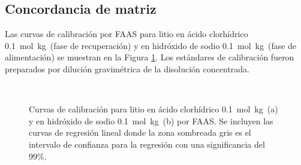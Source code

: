 \subsection{Concordancia de matriz}\label{sec:liexternal}
Las curvas de calibración por \ac{FAAS} para litio en ácido clorhídrico 0.1~mol~kg\mnn\ (fase de recuperación) y en hidróxido de sodio 0.1~mol~kg\mnn\ (fase de alimentación) se muestran en la Figura \ref{fig:LitCurve}. Los estándares de calibración fueron preparados por dilución gravimétrica de la disolución concentrada.

\begin{figure}[H]
    \centering
    \\
    \caption[Curvas de calibración para litio en medio ácido y en medio alcalino1.]{Curvas de calibración para litio en ácido clorhídrico 0.1~mol~kg\mnn\ (a) y en hidróxido de sodio 0.1~mol~kg\mnn\ (b) por FAAS. Se incluyen las curvas de regresión lineal donde la zona sombreada gris es el intervalo de confianza para la regresión con una significancia del 99\%.}
    \label{fig:LitCurve}
\end{figure}
